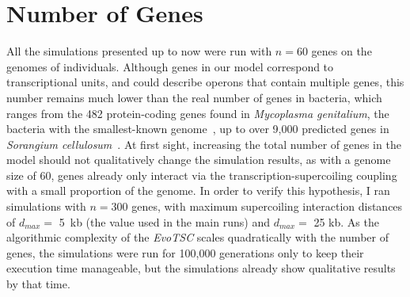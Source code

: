 \section{Number of Genes}
\label{sec:param:300-genes}

All the simulations presented up to now were run with $n = 60$ genes on the genomes of individuals.
Although genes in our model correspond to transcriptional units, and could describe operons that contain multiple genes, this number remains much lower than the real number of genes in bacteria, which ranges from the 482 protein-coding genes found in \emph{Mycoplasma genitalium}, the bacteria with the smallest-known genome~\citep{glass2006}, up to over 9,000 predicted genes in \emph{Sorangium cellulosum}~\citep{schneiker2007}.
At first sight, increasing the total number of genes in the model should not qualitatively change the simulation results, as with a genome size of 60, genes already only interact via the transcription-supercoiling coupling with a small proportion of the genome.
In order to verify this hypothesis, I ran simulations with $n = 300$ genes, with maximum supercoiling interaction distances of $d_{max} =$ 5~kb (the value used in the main runs) and $d_{max} =$ 25 kb.
As the algorithmic complexity of the \emph{EvoTSC} scales quadratically with the number of genes, the simulations were run for 100,000 generations only to keep their execution time manageable, but the simulations already show qualitative results by that time.

